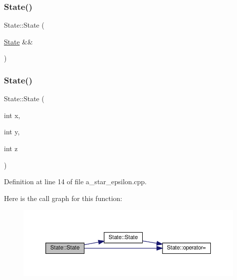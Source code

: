 \subsubsection{\texorpdfstring{State()}{State()}\hspace{0.1cm}{\footnotesize\ttfamily [3/8]}}
{\footnotesize\ttfamily State\+::\+State (\begin{DoxyParamCaption}\item[{\hyperlink{struct_state}{State} \&\&}]{ }\end{DoxyParamCaption})\hspace{0.3cm}{\ttfamily [default]}}

\mbox{\label{struct_state_a044f9afae99d62ad92d1c10932e9be92}} 
\subsubsection{\texorpdfstring{State()}{State()}\hspace{0.1cm}{\footnotesize\ttfamily [4/8]}}
{\footnotesize\ttfamily State\+::\+State (\begin{DoxyParamCaption}\item[{int}]{x,  }\item[{int}]{y,  }\item[{int}]{z }\end{DoxyParamCaption})\hspace{0.3cm}{\ttfamily [inline]}}



Definition at line 14 of file a\+\_\+star\+\_\+epsilon.\+cpp.

Here is the call graph for this function\+:
\nopagebreak
\begin{figure}[H]
\begin{center}
\leavevmode
\includegraphics[width=350pt]{struct_state_a044f9afae99d62ad92d1c10932e9be92_cgraph}
\end{center}
\end{figure}
\mbox{\label{struct_state_ad463f272453461a57c8b9e11f6cad8b6}} 
